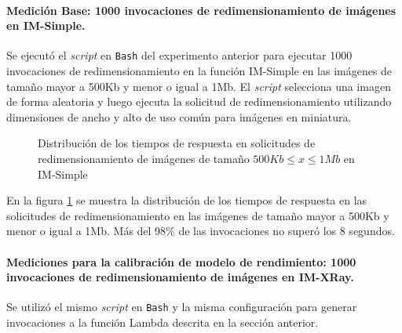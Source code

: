\paragraph{Medición Base: 1000 invocaciones de redimensionamiento de imágenes en IM-Simple.} 
Se ejecutó el \emph{script} en \texttt{Bash} del experimento anterior para ejecutar 1000 invocaciones de redimensionamiento en la función IM-Simple en las imágenes de tamaño mayor a 500Kb y menor o igual a 1Mb. El \emph{script} selecciona una imagen de forma aleatoria y luego ejecuta la solicitud de redimensionamiento utilizando dimensiones de ancho y alto de uso común para imágenes en miniatura.

\begin{figure}[h]
\hspace{-2.0cm}
\caption{Distribución de los tiempos de respuesta en solicitudes de redimensionamiento de imágenes de tamaño $500Kb \leq x \leq 1Mb$ en IM-Simple}
\label{fig:distribucion-solicitudes-imagenes-hasta-1mb}
\end{figure}


En la figura \ref{fig:distribucion-solicitudes-imagenes-hasta-1mb} se muestra la distribución de los tiempos de respuesta en las solicitudes de redimensionamiento en las imágenes de tamaño mayor a 500Kb y menor o igual a 1Mb. Más del 98\% de las invocaciones no superó los 8 segundos.

\paragraph{Mediciones para la calibración de modelo de rendimiento: 1000 invocaciones de redimensionamiento de imágenes en IM-XRay.} Se utilizó el mismo \emph{script} en \texttt{Bash} y la misma configuración para generar invocaciones a la función Lambda descrita en la sección anterior.

